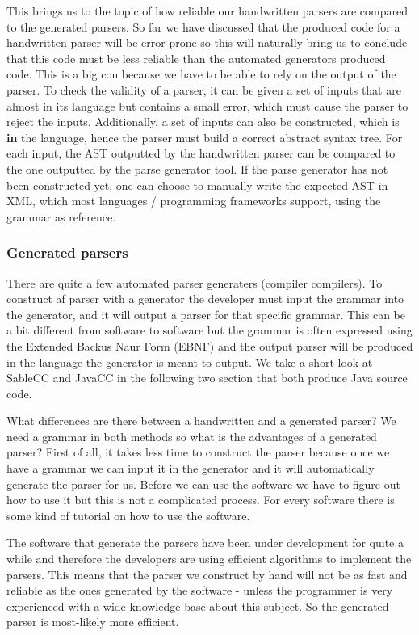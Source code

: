 This brings us to the topic of how reliable our handwritten parsers are compared
to the generated parsers. So far we have discussed that the produced code for a
handwritten parser will be error-prone so this will naturally bring us to
conclude that this code must be less reliable than the automated generators
produced code. This is a big con because we have to be able to rely on the
output of the parser. To check the validity of a parser, it can be given a set
of inputs that are almost in its language but contains a small error, which must
cause the parser to reject the inputs. Additionally, a set of inputs can also be
constructed, which is \textbf{in} the language, hence the parser must build a
correct abstract syntax tree. For each input, the AST outputted by the
handwritten parser can be compared to the one outputted by the parse generator
tool. If the parse generator has not been constructed yet, one can choose to
manually write the expected AST in XML, which most languages / programming
frameworks support, using the grammar as reference.

\subsubsection{Generated parsers}
\label{subsec:generatedparsers}
There are quite a few automated parser generaters (compiler compilers). To
construct af parser with a generator the developer must input the grammar into
the generator, and it will output a parser for that specific grammar. This can
be a bit different from software to software but the grammar is often expressed
using the Extended Backus Naur Form (EBNF) and the output parser will be
produced in the language the generator is meant to output. We take a short look
at SableCC and JavaCC in the following two section that both produce Java source
code.

What differences are there between a handwritten and a generated parser? We need
a grammar in both methods so what is the advantages of a generated parser? First
of all, it takes less time to construct the parser because once we have a
grammar we can input it in the generator and it will automatically generate the
parser for us. Before we can use the software we have to figure out how to use
it but this is not a complicated process. For every software there is some kind
of tutorial on how to use the software.

The software that generate the parsers have been under development for quite a
while and therefore the developers are using efficient algorithms to implement
the parsers. This means that the parser we construct by hand will not be as fast
and reliable as the ones generated by the software - unless the programmer is
very experienced with a wide knowledge base about this subject. So the generated
parser is most-likely more efficient.

